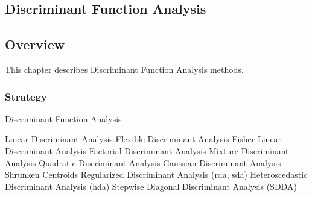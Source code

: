 

\renewcommand{\bibsection}{\subsection{\bibname}}
\begin{bibunit}

\chapter{Discriminant Function Analysis}
\label{ch:discriminant}

\section{Overview}
This chapter describes Discriminant Function Analysis methods.


\subsection{Strategy}

Discriminant Function Analysis


Linear Discriminant Analysis
Flexible Discriminant Analysis
Fisher Linear Discriminant Analysis
Factorial Discriminant Analysis
Mixture Discriminant Analysis
Quadratic Discriminant Analysis
Gaussian Discriminant Analysis
Shrunken Centroids Regularized Discriminant Analysis (rda, sda)
Heteroscedastic Discriminant Analysis (hda)
Stepwise Diagonal Discriminant Analysis (SDDA)


\end{bibunit}
